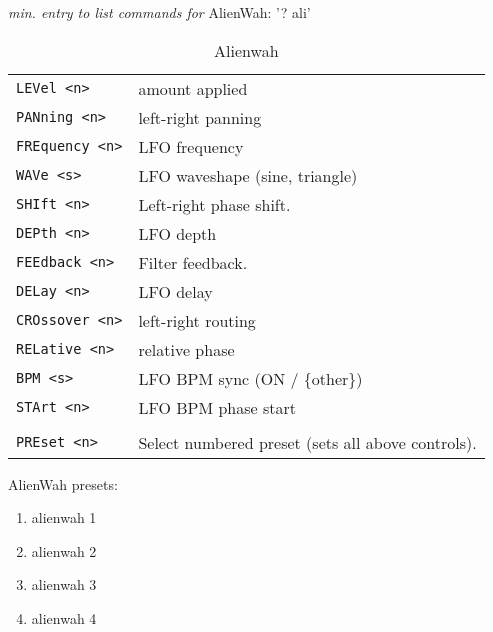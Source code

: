 \pagebreak
   \textsl{min. entry to list commands for} AlienWah:  '? ali'
   \begin{table}[H]
      \centering
      \caption{Alienwah}
      \begin{tabular}{l l}
\texttt{LEVel <n>} &
   amount applied \\
\texttt{PANning <n>} &
   left-right panning \\
\texttt{FREquency <n>} &
   LFO frequency \\
\texttt{WAVe <s>} &
   LFO waveshape (sine, triangle) \\
\texttt{SHIft <n>} &
   Left-right phase shift. \\
\texttt{DEPth <n>} &
   LFO depth \\
\texttt{FEEdback <n>} &
   Filter feedback. \\
\texttt{DELay <n>} &
   LFO delay \\
\texttt{CROssover <n>} &
   left-right routing \\
\texttt{RELative <n>} &
   relative phase \\
\texttt{BPM <s>} &
   LFO BPM sync (ON / \{other\}) \\
\texttt{STArt <n>} &
   LFO BPM phase start \\
\texttt{} & \\ %
\texttt{PREset <n>} &
   Select numbered preset (sets all above controls). \\
      \end{tabular}
   \end{table}
AlienWah presets:
   \begin{enumerate}
   \item alienwah 1
   \item alienwah 2
   \item alienwah 3
   \item alienwah 4
   \end{enumerate}

